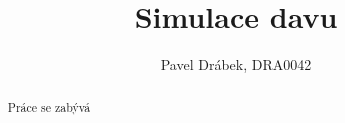 \documentclass[]{article}
\title{Simulace davu}
\author{Pavel Drábek, DRA0042}
\begin{document}
\maketitle

\begin{abstract}
Práce se zabývá 
\end{abstract}

\section{}
\end{document}
